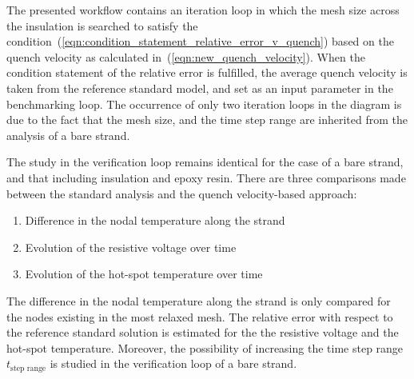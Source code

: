 The presented workflow contains an iteration loop in which the mesh size across the insulation is searched to satisfy the condition~(\ref{eqn:condition_statement_relative_error_v_quench}) based on the quench velocity as calculated in~(\ref{eqn:new_quench_velocity}).
When the condition statement of the relative error is fulfilled, the average quench velocity is taken from the reference standard model, and set as an input parameter in the benchmarking loop. The occurrence of only two iteration loops in the diagram is due to the fact that the mesh size, and the time step range are inherited from the analysis of a bare strand. 

The study in the verification loop remains identical for the case of a bare strand, and that including insulation and epoxy resin. There are three comparisons made between the standard analysis and the quench velocity-based approach: 
\begin{enumerate}
    \item Difference in the nodal temperature along the strand
    \item Evolution of the resistive voltage over time
    \item Evolution of the hot-spot temperature over time
\end{enumerate}
The difference in the nodal temperature along the strand is only compared for the nodes existing in the most relaxed mesh. The relative error with respect to the reference standard solution is estimated for the the resistive voltage and the hot-spot temperature. Moreover, the possibility of increasing the time step range $t_\text{step range}$ is studied in the verification loop of a bare strand.
